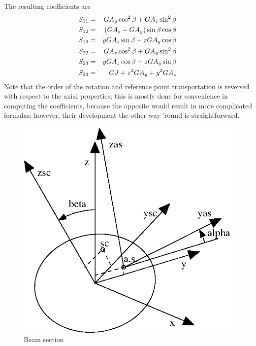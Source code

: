 The resulting coefficients are
\begin{eqnarray*}
	S_{11} & = & GA_y \cos^2\beta + GA_z \sin^2\beta \\
	S_{12} & = & \left( GA_z - GA_y \right) \sin\beta\cos\beta \\
	S_{13} & = & y GA_z \sin\beta - z GA_y \cos\beta \\
	S_{22} & = & GA_z \cos^2\beta + GA_y \sin^2\beta \\
	S_{23} & = & y GA_z \cos\beta + z GA_y \sin\beta \\
	S_{33} & = & GJ + z^2 GA_y + y^2 GA_z
\end{eqnarray*}
Note that the order of the rotation and reference point transportation 
is reversed with respect to the axial properties; this is mostly done
for convenience in computing the coefficients, because the opposite
would result in more complicated formulas; however, their development
the other way 'round is straightforward.

\begin{figure}
\centering
{}
\includegraphics[width=.7\textwidth]{beamsect}
\caption{Beam section}
\label{fig:EL:BEAM:SECTION}
\end{figure}



